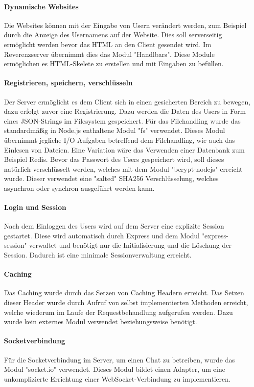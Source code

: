 \paragraph{Dynamische Websites}
Die Websites können mit der Eingabe von Usern verändert werden, zum Beispiel durch die Anzeige des Usernamens auf der Website. Dies soll serverseitig ermöglicht werden bevor das HTML an den Client gesendet wird. Im Reverenzserver übernimmt dies das Modul "Handlbars". Diese Module ermöglichen es HTML-Skelete zu erstellen und mit Eingaben zu befüllen.

\paragraph{Registrieren, speichern, verschlüsseln}
Der Server ermöglicht es dem Client sich in einen gesicherten Bereich zu bewegen, dazu erfolgt zuvor eine Registrierung. Dazu werden die Daten des Users in Form eines JSON-Strings im Filesystem gespeichert. Für das Filehandling wurde das standardmäßig in Node.js enthaltene Modul "fs" verwendet. Dieses Modul übernimmt jegliche I/O-Aufgaben betreffend dem Filehandling, wie auch das Einlesen von Dateien. Eine Variation wäre das Verwenden einer Datenbank zum Beispiel Redis. Bevor das Passwort des Users gespeichert wird, soll dieses natürlich verschlüsselt werden, welches mit dem Modul "bcrypt-nodejs" erreicht wurde. Dieser verwendet eine "salted" SHA256 Verschlüsselung, welches asynchron oder synchron ausgeführt werden kann. 

\paragraph{Login und Session}
Nach dem Einloggen des Users wird auf dem Server eine explizite Session gestartet. Diese wird automatisch durch Express und dem Modul "express-session" verwaltet und benötigt nur die Initialisierung und die Löschung der Session. Dadurch ist eine minimale Sessionverwaltung erreicht.

\paragraph{Caching}
Das Caching wurde durch das Setzen von Caching Headern erreicht. Das Setzen dieser Header wurde durch Aufruf von selbst implementierten Methoden erreicht, welche wiederum im Laufe der Requestbehandlung aufgerufen werden. Dazu wurde kein externes Modul verwendet beziehungsweise benötigt.

\paragraph{Socketverbindung}
Für die Socketverbindung im Server, um einen Chat zu betreiben, wurde das Modul "socket.io" verwendet. Dieses Modul bildet einen Adapter, um eine unkomplizierte Errichtung einer WebSocket-Verbindung zu implementieren.

